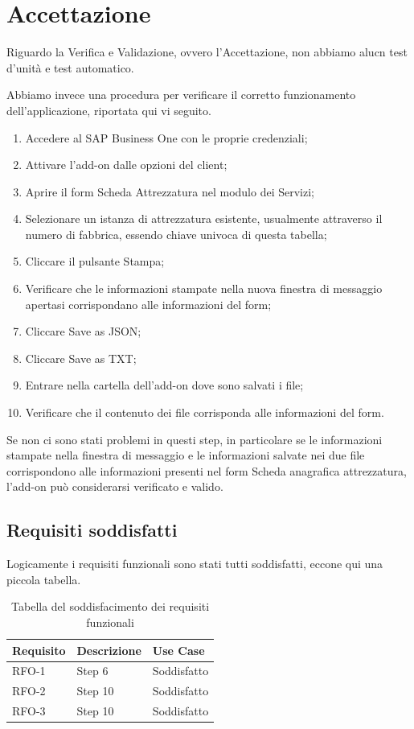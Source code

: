 \newpage

\section{Accettazione}
Riguardo la Verifica e Validazione, ovvero l'Accettazione, non abbiamo alucn test d'unità e test automatico.

Abbiamo invece una procedura per verificare il corretto funzionamento dell'applicazione, riportata qui vi seguito.

\begin{enumerate}
	\item Accedere al SAP Business One con le proprie credenziali;
	\item Attivare l'add-on dalle opzioni del client;
	\item Aprire il form Scheda Attrezzatura nel modulo dei Servizi;
	\item Selezionare un istanza di attrezzatura esistente, usualmente attraverso il numero di fabbrica, essendo chiave univoca di questa tabella;
	\item Cliccare il pulsante Stampa;
	\item Verificare che le informazioni stampate nella nuova finestra di messaggio apertasi corrispondano alle informazioni del form;
	\item Cliccare Save as JSON;
	\item Cliccare Save as TXT;
	\item Entrare nella cartella dell'add-on dove sono salvati i file;
	\item Verificare che il contenuto dei file corrisponda alle informazioni del form.
\end{enumerate}

Se non ci sono stati problemi in questi step, in particolare se le informazioni stampate nella finestra di messaggio e le informazioni salvate nei due file corrispondono alle informazioni presenti nel form Scheda anagrafica attrezzatura, l'add-on può considerarsi verificato e valido.

\subsection{Requisiti soddisfatti}
Logicamente i requisiti funzionali sono stati tutti soddisfatti, eccone qui una piccola tabella.

\begin{table}[!h]%
	\begin{tabularx}{\textwidth}{lXl}
		\hline\hline
		\textbf{Requisito} & \textbf{Descrizione} & \textbf{Use Case}\\
		\hline
		RFO-1     & Step 6 & Soddisfatto \\
		RFO-2     & Step 10 & Soddisfatto\\
		RFO-3     & Step 10 & Soddisfatto\\
		\hline
	\end{tabularx}
	\caption{Tabella del soddisfacimento dei requisiti funzionali}
	\label{tab:requisiti-funzionali-soddisfatti}
\end{table}%